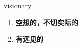 
\begin{frame}
{\huge visionary}
\begin{center}
\begin{enumerate}\Large
  \item \textbf{空想的，不切实际的}
  \item \textbf{有远见的}
\end{enumerate}
\end{center}
\end{frame}
